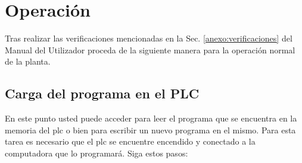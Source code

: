 \section{Operación}
\label{anexo:operacion}

Tras realizar las verificaciones mencionadas en la Sec. 
\ref{anexo:verificaciones} del Manual del Utilizador proceda de la siguiente 
manera para la operación normal de la planta.

\subsection{Carga del programa en el PLC}
\label{anexo:operacionPLC}

En este punto usted puede acceder para leer el programa que se encuentra en la 
memoria del \gls{plc} o bien para escribir un nuevo programa en el mismo. Para 
esta tarea es necesario que el \gls{plc} se encuentre encendido y conectado a la 
computadora que lo programará. Siga estos pasos:

